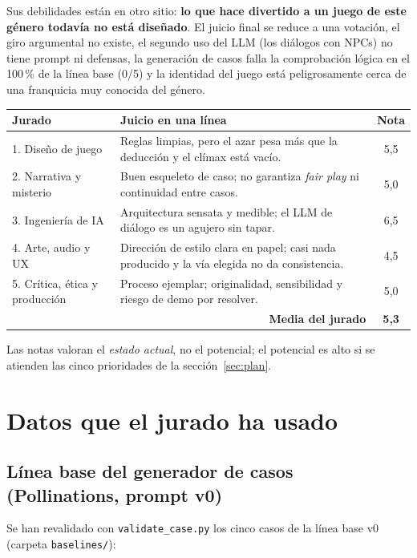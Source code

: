 \documentclass[11pt,a4paper]{article}
\newcommand{\file}[1]{\texttt{\small #1}}
\begin{document}
Sus debilidades están en otro sitio: \textbf{lo que hace divertido a un juego de este género todavía
no está diseñado}. El juicio final se reduce a una votación, el giro argumental no existe, el
segundo uso del LLM (los diálogos con NPCs) no tiene prompt ni defensas, la generación de casos falla
la comprobación lógica en el 100\,\% de la línea base (0/5) y la identidad del juego está
peligrosamente cerca de una franquicia muy conocida del género.

\begin{center}
\renewcommand{\arraystretch}{1.25}
\begin{tabularx}{\linewidth}{l X c}
\toprule
\textbf{Jurado} & \textbf{Juicio en una línea} & \textbf{Nota} \\
\midrule
1. Diseño de juego & Reglas limpias, pero el azar pesa más que la deducción y el clímax está vacío. & 5,5 \\
2. Narrativa y misterio & Buen esqueleto de caso; no garantiza \emph{fair play} ni continuidad entre casos. & 5,0 \\
3. Ingeniería de IA & Arquitectura sensata y medible; el LLM de diálogo es un agujero sin tapar. & 6,5 \\
4. Arte, audio y UX & Dirección de estilo clara en papel; casi nada producido y la vía elegida no da consistencia. & 4,5 \\
5. Crítica, ética y producción & Proceso ejemplar; originalidad, sensibilidad y riesgo de demo por resolver. & 5,0 \\
\midrule
\multicolumn{2}{r}{\textbf{Media del jurado}} & \textbf{5,3} \\
\bottomrule
\end{tabularx}
\end{center}

\noindent Las notas valoran el \emph{estado actual}, no el potencial; el potencial es alto si se
atienden las cinco prioridades de la sección~\ref{sec:plan}.

\section{Datos que el jurado ha usado}

\subsection{Línea base del generador de casos (Pollinations, prompt v0)}

Se han revalidado con \file{validate\_case.py} los cinco casos de la línea base v0
(carpeta \file{baselines/}):
\end{document}
